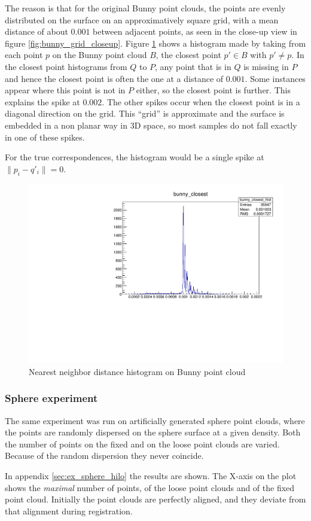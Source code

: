 The reason is that for the original Bunny point clouds, the points are evenly distributed on the surface on an approximatively square grid, with a mean distance of about $0.001$ between adjacent points, as seen in the close-up view in figure \ref{fig:bunny_grid_closeup}. Figure \ref{fig:bunny_closest} shows a histogram made by taking from each point $p$ on the Bunny point cloud $B$, the closest point $p' \in B$ with $p' \neq p$. In the closest point histograms from $Q$ to $P$, any point that is in $Q$ is missing in $P$ and hence the closest point is often the one at a distance of $0.001$. Some instances appear where this point is not in $P$ either, so the closest point is further. This explains the spike at $0.002$. The other spikes occur when the closest point is in a diagonal direction on the grid. This ``grid'' is approximate and the surface is embedded in a non planar way in 3D space, so most samples do not fall exactly in one of these spikes.

For the true correspondences, the histogram would be a single spike at $\|p_i - q'_i\| = 0$. 

\begin{figure}[h]
\centering
\includegraphics[width=.5\linewidth]{fig/bunny_closest.pdf}
\caption{Nearest neighbor distance histogram on Bunny point cloud}
\label{fig:bunny_closest}
\end{figure}

\subsubsection{Sphere experiment}
The same experiment was run on artificially generated sphere point clouds, where the points are randomly dispersed on the sphere surface at a given density. Both the number of points on the fixed and on the loose point clouds are varied. Because of the random dispersion they never coincide. 

In appendix \ref{sec:ex_sphere_hilo} the results are shown. The X-axis on the plot shows the \emph{maximal} number of points, of the loose point clouds and of the fixed point cloud. Initially the point clouds are perfectly aligned, and they deviate from that alignment during  registration.

